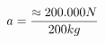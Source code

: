 \documentclass[preview]{standalone}
\begin{document}
\begin{align*}
\special{dvisvgm:raw <g id='unique000'>}a = \frac{\approx 200.000 N}{200 kg}\special{dvisvgm:raw </g>}
\end{align*}
\end{document}

